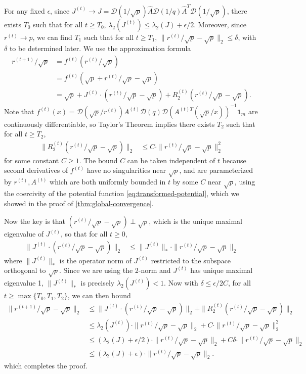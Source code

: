 For any fixed $\epsilon$, since $J^{(t)}\rightarrow J=\mathcal{D}(1/\sqrt{p})\hat{A}\mathcal{D}(1/q)\hat{A}^{T}\mathcal{D}(1/\sqrt{p})$,
there exists $T_{0}$ such that for all $t\geq T_{0}$, $\lambda_{2}(J^{(t)})\leq\lambda_{2}(J)+\epsilon/2$.
Moreover, since $r^{(t)}\rightarrow p$, we can find $T_{1}$ such
that for all $t\geq T_{1}$, $\|r^{(t)}/\sqrt{p}-\sqrt{p}\|_{2}\leq\delta$,
with $\delta$ to be determined later. We use the approximation formula
\begin{align*}
r^{(t+1)}/\sqrt{p} & =f^{(t)}(r^{(t)}/\sqrt{p})\\
 & =f^{(t)}(\sqrt{p}+r^{(t)}/\sqrt{p}-\sqrt{p})\\
 & =\sqrt{p}+J^{(t)}\cdot(r^{(t)}/\sqrt{p}-\sqrt{p})+R_{2}^{(t)}(r^{(t)}/\sqrt{p}-\sqrt{p}).
\end{align*}
Note that $f^{(t)}(x)=\mathcal{D}(\sqrt{p}/r^{(t)})A^{(t)}\mathcal{D}(q)\mathcal{D}(A^{(t)T}(\sqrt{p}/x))^{-1}\mathbf{1}_{m}$
are continuously differentiable, so Taylor's Theorem implies there
exists $T_{2}$ such that for all $t\geq T_{2}$,
\begin{align*}
\|R_{2}^{(t)}(r^{(t)}/\sqrt{p}-\sqrt{p})\|_{2} & \leq C\cdot\|r^{(t)}/\sqrt{p}-\sqrt{p}\|_{2}^{2}
\end{align*}
for some constant $C\geq1$. The bound $C$ can be taken independent
of $t$ because second derivatives of $f^{(t)}$ have no singularities
near $\sqrt{p}$, and are parameterized by $r^{(t)},A^{(t)}$ which
are both uniformly bounded in $t$ by some $C$ near $\sqrt{p}$, using the coercivity of the potential function \eqref{eq:transformed-potential}, which we showed in the proof of \cref{thm:global-convergence}.

Now the key is that $(r^{(t)}/\sqrt{p}-\sqrt{p})\perp\sqrt{p}$, which
is the unique maximal eigenvalue of $J^{(t)}$, so that for all $t\geq0$,
\begin{align*}
\|J^{(t)}\cdot(r^{(t)}/\sqrt{p}-\sqrt{p})\|_{2} & \leq\|J^{(t)}\|_{*}\cdot\|r^{(t)}/\sqrt{p}-\sqrt{p}\|_{2}
\end{align*}
 where $\|J^{(t)}\|_{*}$ is the operator norm of $J^{(t)}$ restricted
to the subspace orthogonal to $\sqrt{p}$. Since we are using the
2-norm and $J^{(t)}$ has unique maximal eigenvalue 1, $\|J^{(t)}\|_{*}$
is precisely $\lambda_{2}(J^{(t)})<1$. Now with $\delta\leq\epsilon/2C$,
for all $t\geq\max\{T_{0},T_{1},T_{2}\}$, we can then bound
\begin{align*}
\|r^{(t+1)}/\sqrt{p}-\sqrt{p}\|_{2} & \leq\|J^{(t)}\cdot(r^{(t)}/\sqrt{p}-\sqrt{p})\|_{2}+\|R_{2}^{(t)}(r^{(t)}/\sqrt{p}-\sqrt{p})\|_{2}\\
 & \leq\lambda_{2}(J^{(t)})\cdot\|r^{(t)}/\sqrt{p}-\sqrt{p}\|_{2}+C\cdot\|r^{(t)}/\sqrt{p}-\sqrt{p}\|_{2}^{2}\\
 & \leq(\lambda_{2}(J)+\epsilon/2)\cdot\|r^{(t)}/\sqrt{p}-\sqrt{p}\|_{2}+C\delta\cdot\|r^{(t)}/\sqrt{p}-\sqrt{p}\|_{2}\\
 & \leq(\lambda_{2}(J)+\epsilon)\cdot\|r^{(t)}/\sqrt{p}-\sqrt{p}\|_{2}.
\end{align*}
 which completes the proof. 

